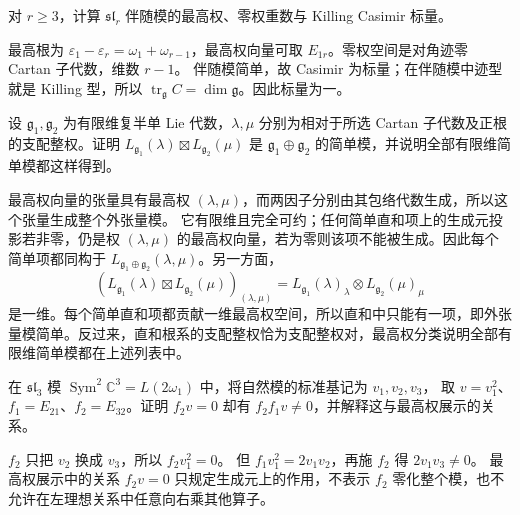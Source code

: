 \begin{exercise}\label{b5:ex:18-adjoint-slr}
	对 \(r\ge3\)，计算 \(\mathfrak{sl}_r\) 伴随模的最高权、零权重数与 Killing Casimir 标量。
\end{exercise}
\begin{solution}
	最高根为 \(\varepsilon_1-\varepsilon_r=\omega_1+\omega_{r-1}\)，最高权向量可取 \(E_{1r}\)。零权空间是对角迹零 Cartan 子代数，维数 \(r-1\)。 伴随模简单，故 Casimir 为标量；在伴随模中迹型就是 Killing 型，所以 \(\operatorname{tr}_{\mathfrak g}C=\dim\mathfrak g\)。因此标量为一。
\end{solution}

\begin{exercise}\label{b5:ex:18-direct-sum-simple}
	设 \(\mathfrak g_1,\mathfrak g_2\) 为有限维复半单 Lie 代数，\(\lambda,\mu\) 分别为相对于所选 Cartan 子代数及正根的支配整权。证明 \(L_{\mathfrak g_1}(\lambda)\boxtimes L_{\mathfrak g_2}(\mu)\) 是 \(\mathfrak g_1\oplus\mathfrak g_2\) 的简单模，并说明全部有限维简单模都这样得到。
\end{exercise}
\begin{solution}
	最高权向量的张量具有最高权 \((\lambda,\mu)\)，而两因子分别由其包络代数生成，所以这个张量生成整个外张量模。 它有限维且完全可约；任何简单直和项上的生成元投影若非零，仍是权 \((\lambda,\mu)\) 的最高权向量，若为零则该项不能被生成。因此每个简单项都同构于 \(L_{\mathfrak g_1\oplus\mathfrak g_2}(\lambda,\mu)\)。另一方面，
	\[
		\left(L_{\mathfrak g_1}(\lambda)\boxtimes L_{\mathfrak g_2}(\mu)\right)_{(\lambda,\mu)} =L_{\mathfrak g_1}(\lambda)_\lambda\otimes L_{\mathfrak g_2}(\mu)_\mu
	\]
	是一维。每个简单直和项都贡献一维最高权空间，所以直和中只能有一项，即外张量模简单。反过来，直和根系的支配整权恰为支配整权对，最高权分类说明全部有限维简单模都在上述列表中。
\end{solution}

\begin{exercise}\label{b5:ex:18-simple-root-relation-warning}
	在 \(\mathfrak{sl}_3\) 模 \(\operatorname{Sym}^2\mathbb C^3=L(2\omega_1)\) 中，将自然模的标准基记为 \(v_1,v_2,v_3\)， 取 \(v=v_1^2\)、\(f_1=E_{21}\)、\(f_2=E_{32}\)。证明 \(f_2v=0\) 却有 \(f_2f_1v\ne0\)，并解释这与最高权展示的关系。
\end{exercise}
\begin{solution}
	\(f_2\) 只把 \(v_2\) 换成 \(v_3\)，所以 \(f_2v_1^2=0\)。 但 \(f_1v_1^2=2v_1v_2\)，再施 \(f_2\) 得 \(2v_1v_3\ne0\)。 最高权展示中的关系 \(f_2v=0\) 只规定生成元上的作用，不表示 \(f_2\) 零化整个模，也不允许在左理想关系中任意向右乘其他算子。
\end{solution}

